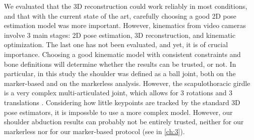 We evaluated that the 3D reconstruction could work reliably in most conditions, and that with the current state of the art, carefully choosing a good 2D pose estimation model was more important. However, kinematics from video cameras involve 3 main stages: 2D pose estimation, 3D reconstruction, and kinematic optimization. The last one has not been evaluated, and yet, it is of crucial importance. Choosing a good kinematic model with consistent constraints and bone definitions will determine whether the results can be trusted, or not. In particular, in this study the shoulder was defined as a ball joint, both on the marker-based and on the markerless analysis. However, the scapulothoracic girdle is a very complex multi-articulated joint, which allows for 3 rotations and 3 translations \cite{Seth2016}. Considering how little keypoints are tracked by the standard 3D pose estimators, it is impossble to use a more complex model. However, our shoulder abduction results can probably not be entirely trusted, neither for our markerless nor for our marker-based protocol (see  in \autoref{ch:3}).

















